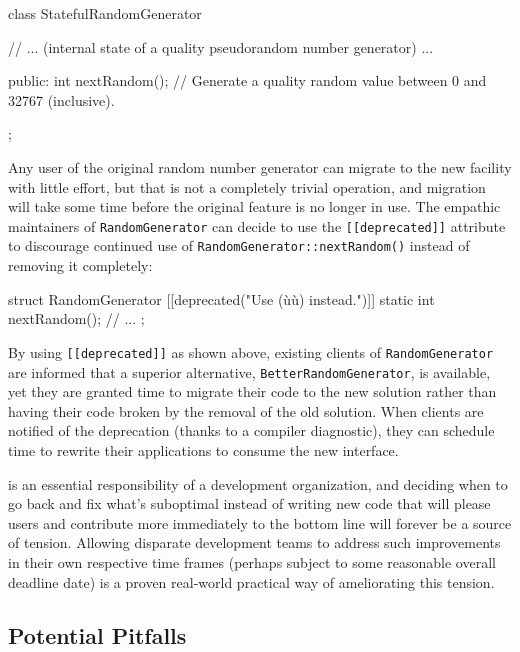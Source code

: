 \begin{emcppslisting}
class StatefulRandomGenerator
{
    // ... (internal state of a quality pseudorandom number generator) ...

public:
    int nextRandom();
       // Generate a quality random value between 0 and 32767 (inclusive).
};
\end{emcppslisting}
    
\noindent Any user of the original random number generator can migrate to the new
facility with little effort, but that is not a completely trivial
operation, and migration will take some time before the original feature is no
longer in use. The empathic maintainers of \lstinline!RandomGenerator! can
decide to use the
\lstinline![[deprecated]]! attribute to discourage continued use
of\linebreak%
 \lstinline!RandomGenerator::nextRandom()! instead of removing it completely:

\begin{emcppslisting}
struct RandomGenerator
{
    [[deprecated("Use (ù{}ù) instead.")]]
    static int nextRandom();
        // ...
};
\end{emcppslisting}
 
\newpage%
\noindent By using \lstinline![[deprecated]]! as shown above, existing clients of
\lstinline!RandomGenerator! are informed that a superior
alternative, \lstinline!BetterRandomGenerator!, is available, yet they are granted time to
migrate their code to the new solution rather than having their code broken by the
removal of the old solution. When clients are notified of the
deprecation (thanks to a compiler diagnostic), they can schedule time to rewrite their applications to consume the new interface.

 is
an essential responsibility of a development organization, and
deciding when to go back and fix what's suboptimal instead of writing
new code that will please users and contribute more immediately to the
bottom line will forever be a source of tension. Allowing disparate
development teams to address such improvements in their own respective
time frames (perhaps subject to some reasonable overall deadline
date) is a proven real-world practical way of ameliorating this
  tension.

\subsection[Potential Pitfalls]{Potential Pitfalls}\label{potential-pitfalls}

